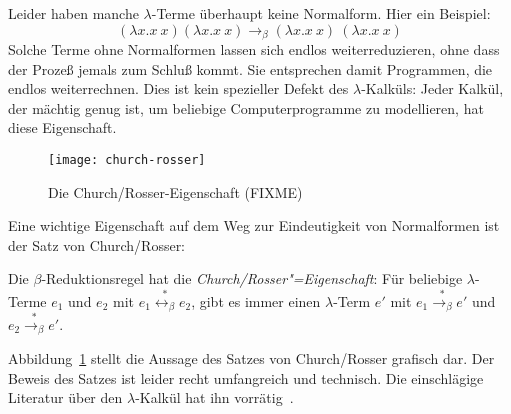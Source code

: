 Leider haben manche
$\lambda$-Terme überhaupt keine Normalform.  Hier ein
Beispiel:
%
\begin{displaymath}
  (\lambda x.x~x)(\lambda x.x~x) \rightarrow_\beta (\lambda x.x~x)~(\lambda x.x~x)
\end{displaymath}
%
Solche Terme ohne Normalformen lassen sich endlos weiterreduzieren,
ohne dass der Prozeß jemals zum Schluß kommt.  Sie entsprechen damit
Programmen, die endlos weiterrechnen.
Dies ist kein spezieller Defekt des
$\lambda$-Kalküls: Jeder Kalkül, der mächtig genug ist, um beliebige
Computerprogramme zu modellieren, hat diese Eigenschaft.

\begin{figure}[tb]
  \begin{center}
    {
      \texttt{[image: church-rosser]}
      }
    \caption{Die Church/Rosser-Eigenschaft (FIXME)}
    \label{fig:church-rosser}
  \end{center}
\end{figure}

Eine wichtige Eigenschaft auf dem Weg zur Eindeutigkeit von
Normalformen ist der Satz von Church/Rosser:
%
\begin{satz}
  \label{satz:church-rosser}
  Die $\beta$-Reduktionsregel hat die 
  \textit{Church/Rosser"=Eigenschaft}:  Für
  beliebige $\lambda$-Terme $e_1$ und  $e_2$ mit
  $e_1 \overset{\ast}{\leftrightarrow_\beta} e_2$,
  gibt es immer einen $\lambda$-Term $e'$ mit
  $e_1\overset{\ast}{\rightarrow_\beta} e'$ und
  $e_2\overset{\ast}{\rightarrow_\beta} e'$.
\end{satz}
%
Abbildung~\ref{fig:church-rosser} stellt die Aussage des Satzes von
Church/Rosser grafisch dar.
Der Beweis des Satzes ist leider recht umfangreich und technisch.
Die einschlägige Literatur über den $\lambda$-Kalkül hat ihn
vorrätig~\cite{HindleySeldin1986}.


